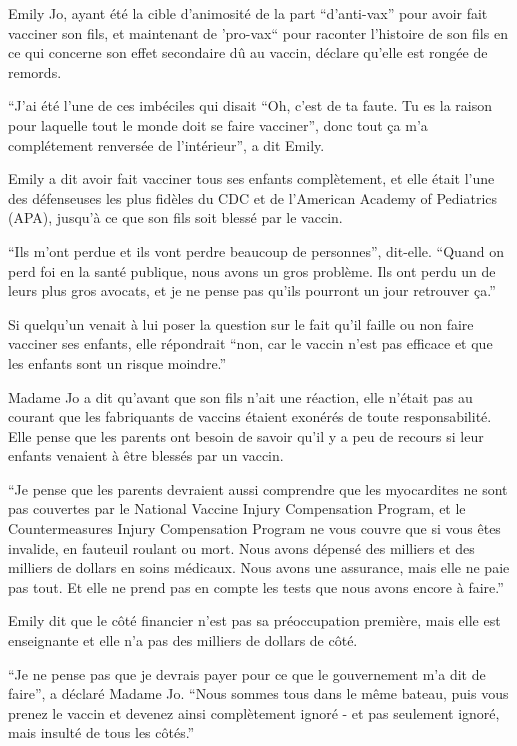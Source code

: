 {Emily Jo, ayant été la cible d'animosité de la part “d'anti-vax” pour avoir fait
vacciner son fils, et maintenant de 'pro-vax“ pour raconter l'histoire de son
fils en ce qui concerne son effet secondaire dû au vaccin, déclare qu'elle est
rongée de remords.

“J'ai été l'une de ces imbéciles qui disait “Oh, c'est de ta faute. Tu es la
raison pour laquelle tout le monde doit se faire vacciner”, donc tout ça m'a
complétement renversée de l'intérieur”, a dit Emily.

Emily a dit avoir fait vacciner tous ses enfants complètement, et elle était
l'une des défenseuses les plus fidèles du CDC et de l'American Academy of
Pediatrics (APA), jusqu'à ce que son fils soit blessé par le vaccin.

“Ils m'ont perdue et ils vont perdre beaucoup de personnes”, dit-elle. “Quand on
perd foi en la santé publique, nous avons un gros problème. Ils ont perdu un de
leurs plus gros avocats, et je ne pense pas qu'ils pourront un jour retrouver
ça.”

Si quelqu'un venait à lui poser la question sur le fait qu'il faille ou non
faire vacciner ses enfants, elle répondrait “non, car le vaccin n'est pas
efficace et que les enfants sont un risque moindre.”

Madame Jo a dit qu'avant que son fils n'ait une réaction, elle n'était pas au
courant que les fabriquants de vaccins étaient exonérés de toute
responsabilité. Elle pense que les parents ont besoin de savoir qu'il y a peu de
recours si leur enfants venaient à être blessés par un vaccin.

“Je pense que les parents devraient aussi comprendre que les myocardites ne sont
pas couvertes par le National Vaccine Injury Compensation Program, et le
Countermeasures Injury Compensation Program ne vous couvre que si vous êtes
invalide, en fauteuil roulant ou mort. Nous avons dépensé des milliers et des
milliers de dollars en soins médicaux. Nous avons une assurance, mais elle ne
paie pas tout. Et elle ne prend pas en compte les tests que nous avons encore à
faire.”

Emily dit que le côté financier n'est pas sa préoccupation première, mais elle
est enseignante et elle n'a pas des milliers de dollars de côté.

“Je ne pense pas que je devrais payer pour ce que le gouvernement m'a dit de
faire”, a déclaré Madame Jo. “Nous sommes tous dans le même bateau, puis vous
prenez le vaccin et devenez ainsi complètement ignoré - et pas seulement ignoré,
mais insulté de tous les côtés.”

}
